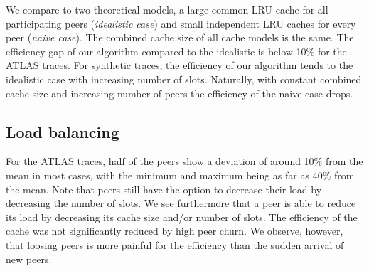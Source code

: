 We compare to two theoretical models, a large common LRU cache for all participating peers (\emph{idealistic case}) and small independent LRU caches for every peer (\emph{naive case}).
The combined cache size of all cache models is the same.
The efficiency gap of our algorithm compared to the idealistic is below 10\% for the ATLAS traces.
For synthetic traces, the efficiency of our algorithm tends to the idealistic case with increasing number of slots.
Naturally, with constant combined cache size and increasing number of peers the efficiency of the naive case drops.

\subsection{Load balancing}
For the ATLAS traces, half of the peers show a deviation of around 10\% from the mean in most cases, with the minimum and maximum being as far as 40\% from the mean.
Note that peers still have the option to decrease their load by decreasing the number of slots. 
We see furthermore that a peer is able to reduce its load by decreasing its cache size and/or number of slots.
The efficiency of the cache was not significantly reduced by high peer churn.
We observe, however, that loosing peers is more painful for the efficiency than the sudden arrival of new peers.
